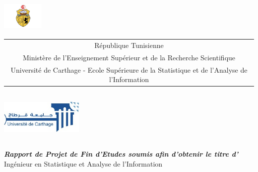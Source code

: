 \documentclass[a4paper, oneside, frenchb]{report}
\title{\reportSubject}
\author{\reportAuthor}
\newcommand{\reportTitle} {%
  \textsc{Projet de Fin d'\'etudes}
}
\newcommand{\ESSAI} {%
  Ecole Sup\'erieure de la Statistique et de l'Analyse de l'Information
}
\begin{document}
\thispagestyle{empty}
\begin{titlepage}
\begin{center}



\includegraphics[width=2cm, height=1.5cm]{embleme.jpg}\\
\vspace{0.5cm}

{%
  \fontsize{9pt}{9pt}\selectfont%
  \begin{tabular}{c}
    R\'epublique Tunisienne \\
    Minist\`ere de l'Enseignement Supérieur et de la Recherche Scientifique \\%
    Universit\'e de Carthage - \ESSAI{}  \\
  \end{tabular}
}

\vspace{1cm}

\includegraphics[width=4cm, height=2.5cm]{universite-carthage.jpg}



\vspace{30pt} {%
  \renewcommand*{\familydefault}{\defaultFont}
  \fontsize{46pt}{46pt}\selectfont%
}

\vspace{10pt}
\textbf{\textit{Rapport de Projet de Fin d'Etudes soumis afin d'obtenir le titre d'}}\\

\vspace{10pt}
Ing\'enieur en Statistique et Analyse de l'Information\\


\end{center}
\end{titlepage}
\end{document}
